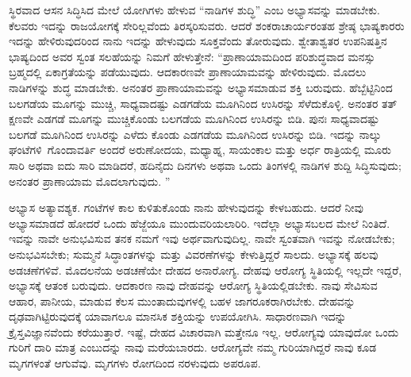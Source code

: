 \vskip 0.3cm

ಸ್ಥಿರವಾದ ಆಸನ ಸಿದ್ಧಿಸಿದ ಮೇಲೆ ಯೋಗಿಗಳು ಹೇಳುವ “ನಾಡಿಗಳ ಶುದ್ಧಿ” ಎಂಬ ಅಭ್ಯಾಸವನ್ನು ಮಾಡಬೇಕು. ಕೆಲವರು ಇದನ್ನು ರಾಜಯೋಗಕ್ಕೆ ಸೇರಿಲ್ಲವೆಂದು ತಿರಸ್ಕರಿಸುವರು. ಆದರೆ ಶಂಕರಾಚಾರ್ಯರಂತಹ ಶ್ರೇಷ್ಠ ಭಾಷ್ಯಕಾರರು ಇದನ್ನು ಹೇಳಿರುವುದರಿಂದ ನಾನು ಇದನ್ನು ಹೇಳುವುದು ಸೂಕ್ತವೆಂದು ತೋರುವುದು. ಶ್ವೇತಾಶ್ವತರ ಉಪನಿಷತ್ತಿನ ಭಾಷ್ಯದಿಂದ ಅವರ ಸ್ವಂತ ಸಲಹೆಯನ್ನು ನಿಮಗೆ ಹೇಳುತ್ತೇನೆ: “ಪ್ರಾಣಾಯಾಮದಿಂದ ಪರಿಶುದ್ಧವಾದ ಮನಸ್ಸು ಬ್ರಹ್ಮದಲ್ಲಿ ಏಕಾಗ್ರತೆಯನ್ನು ಪಡೆಯುವುದು. ಆದಕಾರಣವೇ ಪ್ರಾಣಾಯಾಮವನ್ನು ಹೇಳಿರುವುದು. ಮೊದಲು ನಾಡಿಗಳನ್ನು ಶುದ್ಧ ಮಾಡಬೇಕು. ಅನಂತರ ಪ್ರಾಣಾಯಾಮವನ್ನು ಅಭ್ಯಾಸಮಾಡುವ ಶಕ್ತಿ ಬರುವುದು. ಹೆಬ್ಬೆಟ್ಟಿನಿಂದ ಬಲಗಡೆಯ ಮೂಗನ್ನು ಮುಚ್ಚಿ, ಸಾಧ್ಯವಾದಷ್ಟು ಎಡಗಡೆಯ ಮೂಗಿನಿಂದ ಉಸಿರನ್ನು ಸೆಳೆದುಕೊಳ್ಳಿ. ಅನಂತರ ತತ್​ಕ್ಷಣವೇ ಎಡಗಡೆ ಮೂಗನ್ನು ಮುಚ್ಚಿಕೊಂಡು ಬಲಗಡೆಯ ಮೂಗಿನಿಂದ ಉಸಿರನ್ನು ಬಿಡಿ. ಪುನಃ ಸಾಧ್ಯವಾದಷ್ಟು ಬಲಗಡೆ ಮೂಗಿನಿಂದ ಉಸಿರನ್ನು ಎಳೆದು ಕೊಂಡು ಎಡಗಡೆಯ ಮೂಗಿನಿಂದ ಉಸಿರನ್ನು ಬಿಡಿ. ಇದನ್ನು ನಾಲ್ಕು ಘಂಟೆಗಳಿ\break\ ಗೊಂದಾವರ್ತಿ ಅಂದರೆ ಅರುಣೋದಯ, ಮಧ್ಯಾಹ್ನ, ಸಾಯಂಕಾಲ ಮತ್ತು ಅರ್ಧ ರಾತ್ರಿಯಲ್ಲಿ ಮೂರು ಸಾರಿ ಅಥವಾ ಐದು ಸಾರಿ ಮಾಡಿದರೆ, ಹದಿನೈದು ದಿನಗಳು ಅಥವಾ ಒಂದು ತಿಂಗಳಲ್ಲಿ ನಾಡಿಗಳ ಶುದ್ದಿ ಸಿದ್ಧಿಸುವುದು; ಅನಂತರ ಪ್ರಾಣಾಯಾಮ ಮೊದಲಾಗುವುದು. ”

ಅಭ್ಯಾಸ ಅತ್ಯಾವಶ್ಯಕ. ಗಂಟೆಗಳ ಕಾಲ ಕುಳಿತುಕೊಂಡು ನಾನು ಹೇಳುವುದನ್ನು ಕೇಳಬಹುದು. ಆದರೆ ನೀವು ಅಭ್ಯಾಸಮಾಡದೆ ಹೋದರೆ ಒಂದು ಹೆಜ್ಜೆಯೂ ಮುಂದುವರಿಯಲಾರಿರಿ. ಇದೆಲ್ಲಾ ಅಭ್ಯಾಸಬಲದ ಮೇಲೆ ನಿಂತಿದೆ. ಇವನ್ನು ನಾವೇ ಅನುಭವಿಸುವ ತನಕ ನಮಗೆ ಇವು ಅರ್ಥವಾಗುವುದಿಲ್ಲ. ನಾವೇ ಸ್ವಂತವಾಗಿ ಇವನ್ನು ನೋಡಬೇಕು; ಅನುಭವಿಸಬೇಕು; ಸುಮ್ಮನೆ ಸಿದ್ಧಾಂತಗಳನ್ನು ಮತ್ತು ವಿವರಣೆಗಳನ್ನು ಕೇಳುತ್ತಿದ್ದರೆ ಸಾಲದು. ಅಭ್ಯಾಸಕ್ಕೆ ಹಲವು ಅಡಚಣೆಗಳಿವೆ. ಮೊದಲನೆಯ ಅಡಚಣೆಯೇ ದೇಹದ ಅನಾರೋಗ್ಯ. ದೇಹವು ಆರೋಗ್ಯ ಸ್ಥಿತಿಯಲ್ಲಿ ಇಲ್ಲದೇ ಇದ್ದರೆ, ಅಭ್ಯಾಸಕ್ಕೆ ಆತಂಕ ಬರುವುದು. ಆದಕಾರಣ ನಾವು ದೇಹವನ್ನು ಆರೋಗ್ಯ ಸ್ಥಿತಿಯಲ್ಲಿಡಬೇಕು. ನಾವು ಸೇವಿಸುವ ಆಹಾರ, ಪಾನೀಯ, ಮಾಡುವ ಕೆಲಸ ಮುಂತಾದುವುಗಳಲ್ಲಿ ಬಹಳ ಜಾಗರೂಕರಾಗಿರಬೇಕು. ದೇಹವನ್ನು ದೃಢವಾಗಿಟ್ಟಿರುವುದಕ್ಕೆ ಯಾವಾಗಲೂ ಮಾನಸಿಕ ಶಕ್ತಿಯನ್ನು ಉಪಯೋಗಿಸಿ. ಸಾಧಾರಣವಾಗಿ ಇದನ್ನು ಕ್ರೈಸ್ತವಿಜ್ಞಾನವೆಂದು ಕರೆಯುತ್ತಾರೆ. ಇಷ್ಟೆ, ದೇಹದ ವಿಚಾರವಾಗಿ ಮತ್ತೇನೂ ಇಲ್ಲ. ಆರೋಗ್ಯವು ಯಾವುದೋ ಒಂದು ಗುರಿಗೆ ದಾರಿ ಮಾತ್ರ ಎಂಬುದನ್ನು ನಾವು ಮರೆಯಬಾರದು. ಆರೋಗ್ಯವೇ ನಮ್ಮ ಗುರಿಯಾಗಿದ್ದರೆ ನಾವು ಕೂಡ ಮೃಗಗಳಂತೆ ಆಗುವೆವು. ಮೃಗಗಳು ರೋಗದಿಂದ ನರಳುವುದು ಅಪರೂಪ. 

